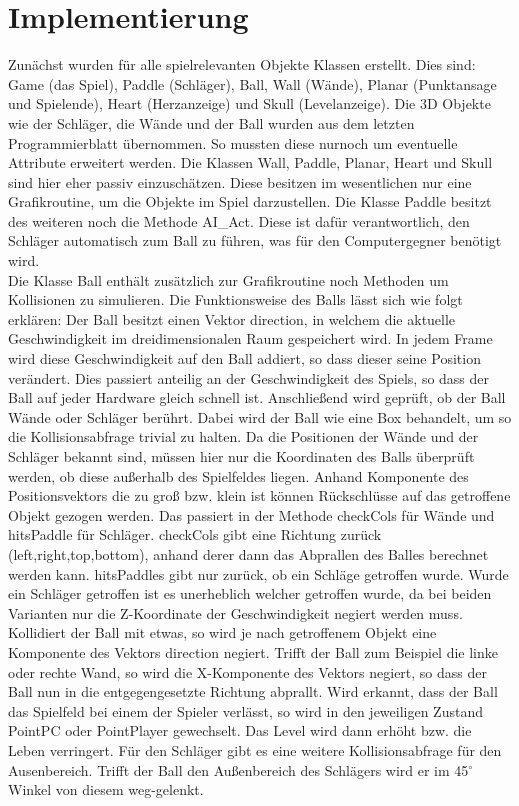 \section{Implementierung}
Zunächst wurden für alle spielrelevanten Objekte Klassen erstellt. Dies sind: Game (das Spiel), Paddle (Schläger), Ball, Wall (Wände), Planar (Punktansage und Spielende), Heart (Herzanzeige) und Skull (Levelanzeige). Die 3D Objekte wie der Schläger, die Wände und der Ball wurden aus dem letzten Programmierblatt übernommen. So mussten diese nurnoch um eventuelle Attribute erweitert werden. Die Klassen Wall, Paddle, Planar, Heart und Skull sind hier eher passiv einzuschätzen. Diese besitzen im wesentlichen nur eine Grafikroutine, um die Objekte im Spiel darzustellen. Die Klasse Paddle besitzt des weiteren noch die Methode AI\_Act. Diese ist dafür verantwortlich, den Schläger automatisch zum Ball zu führen, was für den Computergegner benötigt wird.\\
Die Klasse Ball enthält zusätzlich zur Grafikroutine noch Methoden um Kollisionen zu simulieren. Die Funktionsweise des Balls lässt sich wie folgt erklären: Der Ball besitzt einen Vektor direction, in welchem die aktuelle Geschwindigkeit im dreidimensionalen Raum gespeichert wird. In jedem Frame wird diese Geschwindigkeit auf den Ball addiert, so dass dieser seine Position verändert. Dies passiert anteilig an der Geschwindigkeit des Spiels, so dass der Ball auf jeder Hardware gleich schnell ist. Anschließend wird geprüft, ob der Ball Wände oder Schläger berührt. Dabei wird der Ball wie eine Box behandelt, um so die Kollisionsabfrage trivial zu halten. Da die Positionen der Wände und der Schläger bekannt sind, müssen hier nur die Koordinaten des Balls überprüft werden, ob diese außerhalb des Spielfeldes liegen. Anhand Komponente des Positionsvektors die zu groß bzw. klein ist können Rückschlüsse auf das getroffene Objekt gezogen werden. Das passiert in der Methode checkCols für Wände und hitsPaddle für Schläger. checkCols gibt eine Richtung zurück (left,right,top,bottom), anhand derer dann das Abprallen des Balles berechnet werden kann. hitsPaddles gibt nur zurück, ob ein Schläge getroffen wurde. Wurde ein Schläger getroffen ist es unerheblich welcher getroffen wurde, da bei beiden Varianten nur die Z-Koordinate der Geschwindigkeit negiert werden muss. Kollidiert der Ball mit etwas, so wird je nach getroffenem Objekt eine Komponente des Vektors direction negiert. Trifft der Ball zum Beispiel die linke oder rechte Wand, so wird die X-Komponente des Vektors negiert, so dass der Ball nun in die entgegengesetzte Richtung abprallt. Wird erkannt, dass der Ball das Spielfeld bei einem der Spieler verlässt, so wird in den jeweiligen Zustand PointPC oder PointPlayer gewechselt. Das Level wird dann erhöht bzw. die Leben verringert. Für den Schläger gibt es eine weitere Kollisionsabfrage für den Ausenbereich. Trifft der Ball den Außenbereich des Schlägers wird er im 45$^{\circ}$ Winkel von diesem weg-gelenkt.\\
